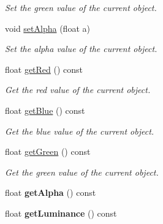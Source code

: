 \begin{DoxyCompactItemize}
\begin{DoxyCompactList}\small\item\em Set the green value of the current object. \end{DoxyCompactList}\item 
void \hyperlink{classColorData_a547fb7bd1616e8657a825cb9a34c43c1}{set\+Alpha} (float a)\hypertarget{classColorData_a547fb7bd1616e8657a825cb9a34c43c1}{}\label{classColorData_a547fb7bd1616e8657a825cb9a34c43c1}

\begin{DoxyCompactList}\small\item\em Set the alpha value of the current object. \end{DoxyCompactList}\item 
float \hyperlink{classColorData_ab7066467c08dfad868fc4b1add70c2f2}{get\+Red} () const \hypertarget{classColorData_ab7066467c08dfad868fc4b1add70c2f2}{}\label{classColorData_ab7066467c08dfad868fc4b1add70c2f2}

\begin{DoxyCompactList}\small\item\em Get the red value of the current object. \end{DoxyCompactList}\item 
float \hyperlink{classColorData_ad9c600256c8abefdd76209fc1f68fcb5}{get\+Blue} () const \hypertarget{classColorData_ad9c600256c8abefdd76209fc1f68fcb5}{}\label{classColorData_ad9c600256c8abefdd76209fc1f68fcb5}

\begin{DoxyCompactList}\small\item\em Get the blue value of the current object. \end{DoxyCompactList}\item 
float \hyperlink{classColorData_a7e2e03b8e1e3270f33c4e4a69c00dbd6}{get\+Green} () const \hypertarget{classColorData_a7e2e03b8e1e3270f33c4e4a69c00dbd6}{}\label{classColorData_a7e2e03b8e1e3270f33c4e4a69c00dbd6}

\begin{DoxyCompactList}\small\item\em Get the green value of the current object. \end{DoxyCompactList}\item 
float {\bfseries get\+Alpha} () const \hypertarget{classColorData_a198c4490b4f1c512d2bc174418dc892a}{}\label{classColorData_a198c4490b4f1c512d2bc174418dc892a}

\item 
float {\bfseries get\+Luminance} () const \hypertarget{classColorData_ae6a0100e4e5fe7bbd00fb4defd6e4a43}{}\label{classColorData_ae6a0100e4e5fe7bbd00fb4defd6e4a43}


\end{DoxyCompactItemize}
